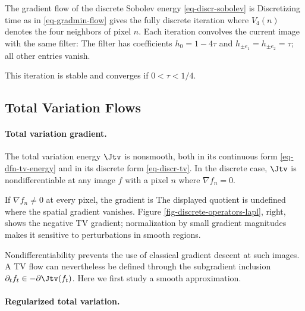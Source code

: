 The gradient flow of the discrete Sobolev energy \eqref{eq-discr-sobolev} is
Discretizing time as in \eqref{eq-gradmin-flow} gives the fully discrete iteration
where $V_4(n)$ denotes the four neighbors of pixel $n$. Each iteration convolves the current image with the same filter:
The filter has coefficients $h_0=1-4\tau$ and $h_{\pm e_1}=h_{\pm e_2}=\tau$; all other entries vanish.

This iteration is stable and converges if $0<\tau<1/4$.



                                                                      
\subsection{Total Variation Flows}

  
\paragraph{Total variation gradient.}

The total variation energy $\Jtv$ is nonsmooth, both in its continuous form \eqref{eq-dfn-tv-energy} and in its discrete form \eqref{eq-discr-tv}. In the discrete case, $\Jtv$ is nondifferentiable at any image $f$ with a pixel $n$ where $\nabla f_n = 0$.

If $\nabla f_n\neq0$ at every pixel, the gradient is
The displayed quotient is undefined where the spatial gradient vanishes. Figure \ref{fig-discrete-operators-lapl}, right, shows the negative TV gradient; normalization by small gradient magnitudes makes it sensitive to perturbations in smooth regions.

Nondifferentiability prevents the use of classical gradient descent at such images. A TV flow can nevertheless be defined through the subgradient inclusion $\partial_t f_t\in-\partial\Jtv(f_t)$. Here we first study a smooth approximation.

  
\paragraph{Regularized total variation.}
	
